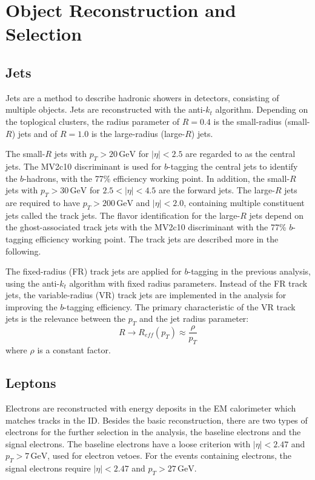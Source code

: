 \documentclass[class=NTHU_thesis, crop=false]{standalone}
\begin{document}
\section{Object Reconstruction and Selection}
\subsection{Jets}
Jets are a method to describe hadronic showers in detectors, consisting of multiple objects. Jets are reconstructed with the anti-$k_t$ algorithm\cite{1126-6708-2008-04-063}. Depending on the toplogical clusters, the radius parameter of $R = 0.4$ is the small-radius (small-$R$) jets and of $R = 1.0$ is the large-radius (large-$R$) jets.

The small-$R$ jets with $p_T > 20\, \mathrm{GeV}$ for $\left|\eta\right| < 2.5$ are regarded to as the central jets. The MV2c10 discriminant is used for $b$-tagging the central jets to identify the $b$-hadrons, with the 77\% efficiency working point. In addition, the small-$R$ jets with $p_T > 30\, \mathrm{GeV}$ for $2.5 < \left|\eta\right| < 4.5$ are the forward jets. The large-$R$ jets are required to have $p_T > 200\, \mathrm{GeV}$ and $\left|\eta\right| < 2.0$, containing multiple constituent jets called the track jets. The flavor identification for the large-$R$ jets depend on the ghost-associated track jets with the MV2c10 discriminant with the 77\% $b$-tagging efficiency working point. The track jets are described more in the following.

The fixed-radius (FR) track jets are applied for $b$-tagging in the previous analysis, using the anti-$k_t$ algorithm with fixed radius parameters. Instead of the FR track jets, the variable-radius (VR) track jets are implemented in the analysis for improving the $b$-tagging efficiency. The primary characteristic of the VR track jets is the relevance between the $p_T$ and the jet radius parameter: 
\begin{equation}
R \to R_{eff}(p_T) \approx \frac{\rho}{p_T}
\end{equation}
where $\rho$ is a constant factor.

\subsection{Leptons}
Electrons are reconstructed with energy deposits in the EM calorimeter which matches tracks in the ID. Besides the basic reconstruction, there are two types of electrons for the further selection in the analysis, the baseline electrons and the signal electrons. The baseline electrons have a loose criterion with $\left|\eta\right| < 2.47$ and $p_T > 7\, \mathrm{GeV}$, used for electron vetoes. For the events containing electrons, the signal electrons require $\left|\eta\right| < 2.47$ and $p_T > 27\, \mathrm{GeV}$.
\end{document}
